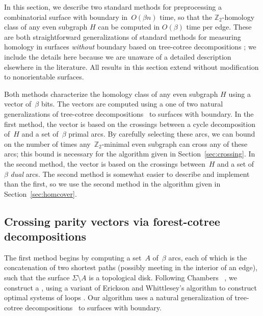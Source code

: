 \documentclass[11pt,twoside]{article}
\def\Z{\mathbb{Z}}
\begin{document}
In this section, we describe two standard methods for preprocessing a combinatorial surface with boundary in~$O(\beta n)$ time, so that the $\Z_2$-homology class of any even subgraph $H$ can be computed in $O(\beta)$ time per edge.  These are both straightforward generalizations of standard methods for measuring homology in surfaces \emph{without} boundary based on tree-cotree decompositions \cite{ew-gohhg-05, ccelw-scsih-08, e-dgteg-03}; we include the details here because we are unaware of a detailed description elsewhere in the literature.  All results in this section extend without modification to nonorientable surfaces.

Both methods characterize the homology class of any even subgraph $H$ using a vector of~$\beta$ bits.
The vectors are computed using a one of two natural generalizations of tree-cotree decompositions~\cite{e-dgteg-03} to surfaces with boundary.
In the first method, the vector is based on the crossings between a cycle decomposition of~$H$ and a set of~$\beta$ primal arcs.
By carefully selecting these arcs, we can bound on the number of times any~$\Z_2$-minimal even subgraph can cross any of these arcs; this bound is necessary for the algorithm given in Section~\ref{sec:crossing}.
In the second method, the vector is based on the crossings between~$H$ and a set of~$\beta$ \emph{dual} arcs.
The second method is somewhat easier to describe and implement than the first, so we use the second method in the algorithm given in Section~\ref{sec:homcover}.


\subsection{Crossing parity vectors via forest-cotree decompositions}
\label{sec:characterizing_crossings}

The first method begins by computing a set~$A$ of~$\beta$ arcs, each of which is the concatenation of two shortest paths (possibly meeting in the interior of an edge), such that the surface $\Sigma\setminus A$ is a topological disk.
Following Chambers \etal~\cite{ccelw-scsih-08}, we construct a , using a variant of Erickson and Whittlesey's algorithm to construct optimal systems of loops \cite{ew-gohhg-05}.  Our algorithm uses a natural generalization of tree-cotree decompositions~\cite{e-dgteg-03} to surfaces with boundary.
\end{document}
